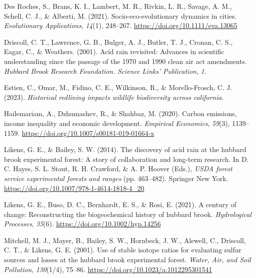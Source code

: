 \documentclass[
  english,
  jou]{apa6}
\newlength{\cslhangindent}
\newenvironment{CSLReferences}[2] %
 {\begin{list}{}{%
  \setlength{\itemindent}{0pt}
  \setlength{\leftmargin}{0pt}
  \setlength{\parsep}{0pt}
  \ifodd #1
   \setlength{\leftmargin}{\cslhangindent}
   \setlength{\itemindent}{-1\cslhangindent}
  \fi
  \setlength{\itemsep}{#2\baselineskip}}}
 {\end{list}}
\begin{document}
\protect{}\label{refs}
\begin{CSLReferences}{1}{0}
Des Roches, S., Brans, K. I., Lambert, M. R., Rivkin, L. R., Savage, A. M., Schell, C. J., \& Alberti, M. (2021). Socio-eco-evolutionary dynamics in cities. \emph{Evolutionary Applications}, \emph{14}(1), 248--267. \url{https://doi.org/10.1111/eva.13065}

Driscoll, C. T., Lawrence, G. B., Bulger, A. J., Butler, T. J., Cronan, C. S., Eagar, C., \& Weathers. (2001). Acid rain revisited: Advances in scientific understanding since the passage of the 1970 and 1990 clean air act amendments. \emph{Hubbard Brook Research Foundation. Science Links' Publication}, \emph{1}.

Estien, C., Omar, M., Fidino, C. E., Wilkinson, R., \& Morello-Frosch, C. J. (2023). \emph{Historical redlining impacts wildlife biodiversity across california}.

Hailemariam, A., Dzhumashev, R., \& Shahbaz, M. (2020). Carbon emissions, income inequality and economic development. \emph{Empirical Economics}, \emph{59}(3), 1139--1159. \url{https://doi.org/10.1007/s00181-019-01664-x}

Likens, G. E., \& Bailey, S. W. (2014). The discovery of acid rain at the hubbard brook experimental forest: A story of collaboration and long-term research. In D. C. Hayes, S. L. Stout, R. H. Crawford, \& A. P. Hoover (Eds.), \emph{USDA forest service experimental forests and ranges} (pp. 463--482). Springer New York. \url{https://doi.org/10.1007/978-1-4614-1818-4_20}

Likens, G. E., Buso, D. C., Bernhardt, E. S., \& Rosi, E. (2021). A century of change: Reconstructing the biogeochemical history of hubbard brook. \emph{Hydrological Processes}, \emph{35}(6). \url{https://doi.org/10.1002/hyp.14256}

Mitchell, M. J., Mayer, B., Bailey, S. W., Hornbeck, J. W., Alewell, C., Driscoll, C. T., \& Likens, G. E. (2001). Use of stable isotope ratios for evaluating sulfur sources and losses at the hubbard brook experimental forest. \emph{Water, Air, and Soil Pollution}, \emph{130}(1/4), 75--86. \url{https://doi.org/10.1023/a:1012295301541}


\end{CSLReferences}
\end{document}
